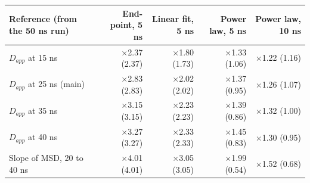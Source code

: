 \begin{tabular}{lrrrr}
\toprule
Reference (from the 50 ns run) & End-point, 5 ns & Linear fit, 5 ns & Power law, 5 ns & Power law, 10 ns \\
\midrule
$D_{app}$ at 15 ns & $\times$2.37 (2.37) & $\times$1.80 (1.73) & $\times$1.33 (1.06) & $\times$1.22 (1.16) \\
$D_{app}$ at 25 ns (main) & $\times$2.83 (2.83) & $\times$2.02 (2.02) & $\times$1.37 (0.95) & $\times$1.26 (1.07) \\
$D_{app}$ at 35 ns & $\times$3.15 (3.15) & $\times$2.23 (2.23) & $\times$1.39 (0.86) & $\times$1.32 (1.00) \\
$D_{app}$ at 40 ns & $\times$3.27 (3.27) & $\times$2.33 (2.33) & $\times$1.45 (0.83) & $\times$1.30 (0.95) \\
Slope of MSD, 20 to 40 ns & $\times$4.01 (4.01) & $\times$3.05 (3.05) & $\times$1.99 (0.54) & $\times$1.52 (0.68) \\
\bottomrule
\end{tabular}
